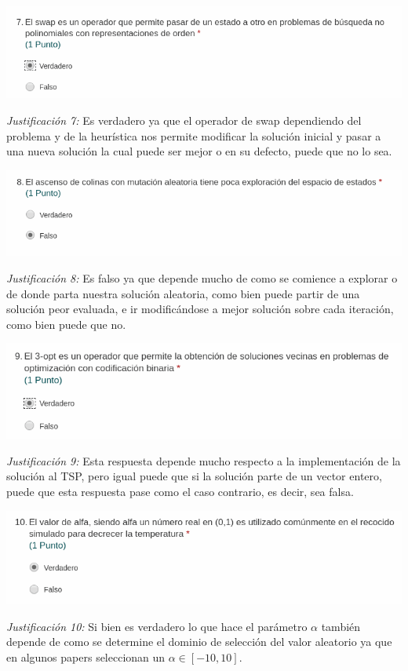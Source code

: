 \documentclass[10pt]{article}
\begin{document}
\begin{center}
  \includegraphics[scale=0.5]{img/p7.png}
\end{center}
\textit{Justificación 7: }Es verdadero ya que el operador de swap dependiendo del problema y de la heurística nos permite modificar la solución inicial y pasar a una nueva solución la cual puede ser mejor o en su defecto, puede que no lo sea.\\

\begin{center}
  \includegraphics[scale=0.5]{img/p8.png}
\end{center}
\textit{Justificación 8: }Es falso ya que depende mucho de como se comience a explorar o de donde parta nuestra solución aleatoria, como bien puede partir de una solución peor evaluada, e ir modificándose a mejor solución sobre cada iteración, como bien puede que no.\\

\begin{center}
  \includegraphics[scale=0.5]{img/p9.png}
\end{center}
\textit{Justificación 9: }Esta respuesta depende mucho respecto a la implementación de la solución al TSP, pero igual puede que si la solución parte de un vector entero, puede que esta respuesta pase como el caso contrario, es decir, sea falsa.\\

\begin{center}
  \includegraphics[scale=0.5]{img/p10.png}
\end{center}
\textit{Justificación 10: }Si bien es verdadero lo que hace el parámetro $\alpha$ también depende de como se determine el dominio de selección del valor aleatorio ya que en algunos papers seleccionan un $\alpha\in[-10,10]$.
\end{document}
